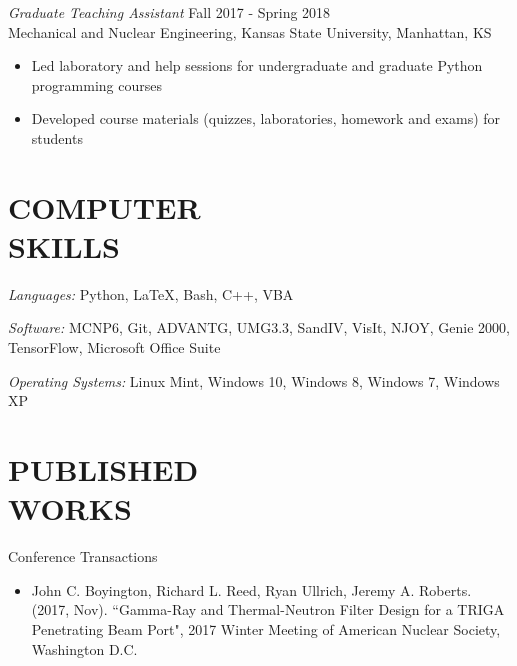 \documentclass[margin, 10pt]{res} %
\begin{document}
\begin{resume}
{\sl Graduate Teaching Assistant} \hfill Fall 2017 - Spring 2018 \\
Mechanical and Nuclear Engineering, Kansas State University, Manhattan, KS \\
\begin{itemize} \itemsep -2pt %
    \item Led laboratory and help sessions for undergraduate and graduate Python programming courses
    \item Developed course materials (quizzes, laboratories, homework and exams) for students
\end{itemize}


\section{COMPUTER \\ SKILLS} 

{\sl Languages:}
Python, \LaTeX, Bash, C++, VBA

{\sl Software:}
MCNP6, Git, ADVANTG, UMG3.3, SandIV, VisIt, NJOY, Genie 2000, TensorFlow, Microsoft Office Suite

{\sl Operating Systems:}
Linux Mint, Windows 10, Windows 8, Windows 7, Windows XP

\section{PUBLISHED \\ WORKS}
Conference Transactions
\begin{itemize}
\item John C. Boyington, Richard L. Reed, Ryan Ullrich, Jeremy A. Roberts. (2017, Nov). ``Gamma-Ray and Thermal-Neutron Filter Design for a TRIGA Penetrating Beam Port", 2017 Winter Meeting of American Nuclear Society, Washington D.C.
\end{itemize}


\end{resume}
\end{document}
